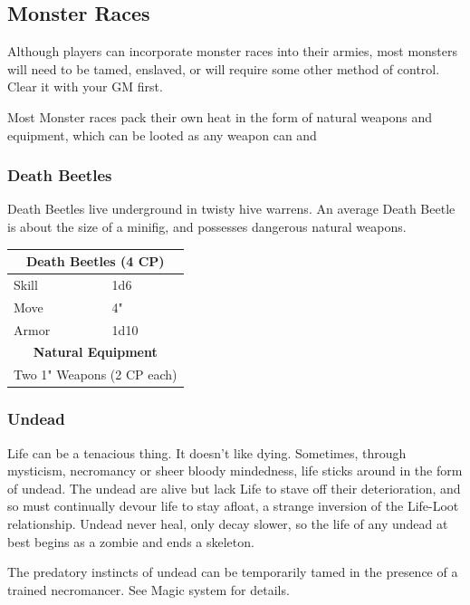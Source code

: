 \documentclass[12pt,a4paper,twocolumn]{article}
\begin{document}
\subsection{Monster Races}

Although players can incorporate monster races into their armies, most monsters will need to be tamed, enslaved, or will require some other method of control.  Clear it with your GM first.

Most Monster races pack their own heat in the form of natural weapons and equipment, which can be looted as any weapon can and 

\subsubsection{Death Beetles}

Death Beetles live underground in twisty hive warrens.  An average Death Beetle is about the size of a minifig, and possesses dangerous natural weapons.

\begin{tabular}{|l|l|}
\multicolumn{2}{c}{\bf Death Beetles (4 CP) } \\ \hline
Skill & 1d6 \\ \hline
Move & 4" \\ \hline
Armor & 1d10 \\ \hline

\multicolumn{2}{c}{\bf Natural Equipment } \\ \hline
\multicolumn{2}{c}{ Two 1" Weapons (2 CP each) } \\ \hline
\end{tabular}

\subsubsection{Undead}

Life can be a tenacious thing.  It doesn't like dying.  Sometimes, through mysticism, necromancy or sheer bloody mindedness, life sticks around in the form of undead.  The undead are alive but lack Life to stave off their deterioration, and so must continually devour life to stay afloat, a strange inversion of the Life-Loot relationship.  Undead never heal, only decay slower, so the life of any undead at best begins as a zombie and ends a skeleton.

The predatory instincts of undead can be temporarily tamed in the presence of a trained necromancer.  See Magic system for details.
\end{document}
